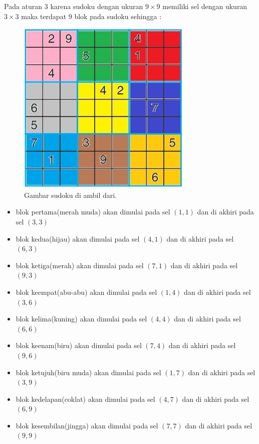 Pada aturan 3 karena sudoku dengan ukuran $9\times9$ memiliki sel dengan ukuran $3\times3$ maka terdapat 9 blok pada sudoku sehingga :

\begin{figure}[H]
\begin{centering}
	\includegraphics[scale=0.7]{gambar/9x9color.jpeg}
	
	\caption{Gambar sudoku di ambil dari.}
\end{centering}
\end{figure}

\begin{itemize}
	\item blok pertama(merah muda) akan dimulai pada sel $\left(1,1\right)$ dan di akhiri
	pada sel $\left(3,3\right)$
	\item blok kedua(hijau) akan dimulai pada sel $\left(4,1\right)$ dan di akhiri
	pada sel $\left(6,3\right)$
	\item blok ketiga(merah) akan dimulai pada sel $\left(7,1\right)$ dan di akhiri
	pada sel $\left(9,3\right)$
	\item blok keempat(abu-abu) akan dimulai pada sel $\left(1,4\right)$ dan di akhiri
	pada sel $\left(3,6\right)$
	\item blok kelima(kuning) akan dimulai pada sel $\left(4,4\right)$ dan di akhiri
	pada sel $\left(6,6\right)$
	\item blok keenam(biru) akan dimulai pada sel $\left(7,4\right)$ dan di akhiri
	pada sel $\left(9,6\right)$
	\item blok ketujuh(biru muda) akan dimulai pada sel $\left(1,7\right)$ dan di akhiri
	pada sel $\left(3,9\right)$
	\item blok kedelapan(coklat) akan dimulai pada sel $\left(4,7\right)$ dan di akhiri
	pada sel $\left(6,9\right)$
	\item blok kesembilan(jingga) akan dimulai pada sel $\left(7,7\right)$ dan di akhiri
	pada sel $\left(9,9\right)$
\end{itemize}

